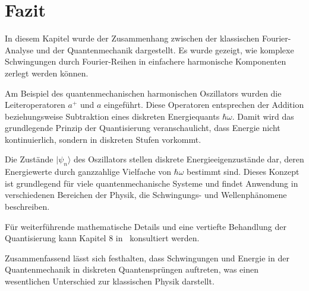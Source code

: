 \section{Fazit\label{fourier:section:fazit}}
	In diesem Kapitel wurde der Zusammenhang zwischen der klassischen Fourier-Analyse und der Quantenmechanik dargestellt.
	Es wurde gezeigt, wie komplexe Schwingungen durch Fourier-Reihen in einfachere harmonische Komponenten zerlegt werden können.

	Am Beispiel des quantenmechanischen harmonischen Oszillators wurden die Leiteroperatoren $a^+$ und $a$ eingeführt.
	Diese Operatoren entsprechen der Addition beziehungsweise Subtraktion eines diskreten Energiequants $\hbar \omega$.
	Damit wird das grundlegende Prinzip der Quantisierung veranschaulicht, dass Energie nicht kontinuierlich, sondern in diskreten Stufen vorkommt.

	Die Zustände $|\psi_n\rangle$ des Oszillators stellen diskrete Energieeigenzustände dar, deren Energiewerte durch ganzzahlige Vielfache von $\hbar \omega$ bestimmt sind.
	Dieses Konzept ist grundlegend für viele quantenmechanische Systeme und findet Anwendung in verschiedenen Bereichen der Physik, die Schwingungs- und Wellenphänomene beschreiben.

	Für weiterführende mathematische Details und eine vertiefte Behandlung der Quantisierung kann Kapitel 8 in~\cite{fourier:quantenmechanik} konsultiert werden.

	Zusammenfassend lässt sich festhalten, dass Schwingungen und Energie in der Quantenmechanik in diskreten Quantensprüngen auftreten, was einen wesentlichen Unterschied zur klassischen Physik darstellt.
